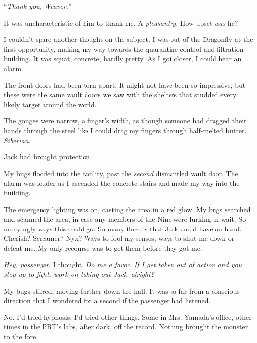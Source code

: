 ``\emph{Thank you, Weaver.}''



It was uncharacteristic of him to thank me.  A \emph{pleasantry}.  How upset \emph{was} he?



I couldn't spare another thought on the subject.  I was out of the Dragonfly at the first opportunity, making my way towards the quarantine control and filtration building.  It was squat, concrete, hardly pretty.  As I got closer, I could hear an alarm.



The front doors had been torn apart.  It might not have been so impressive, but these were the same vault doors we saw with the shelters that studded every likely target around the world.



The gouges were narrow, a finger's width, as though someone had dragged their hands through the steel like I could drag my fingers through half-melted butter.  \emph{Siberian}.



Jack had brought protection.



My bugs flooded into the facility, past the \emph{second }dismantled vault door.  The alarm was louder as I ascended the concrete stairs and made my way into the building.



The emergency lighting was on, casting the area in a red glow.  My bugs searched and scanned the area, in case any members of the Nine were lurking in wait.  So many ugly ways this could go.  So many threats that Jack could have on hand.  Cherish?  Screamer?  Nyx?  Ways to fool my senses, ways to shut me down or defeat me.  My only recourse was to get them before they got me.



\emph{Hey, passenger}, I thought.  \emph{Do me a favor.  If I get taken out of action and you step up to fight, work on taking out Jack, alright?}



My bugs stirred, moving further down the hall.  It was so far from a conscious direction that I wondered for a second if the passenger had listened.



No.  I'd tried hypnosis, I'd tried other things.  Some in Mrs. Yamada's office, other times in the PRT's labs, after dark, off the record.  Nothing brought the monster to the fore.



